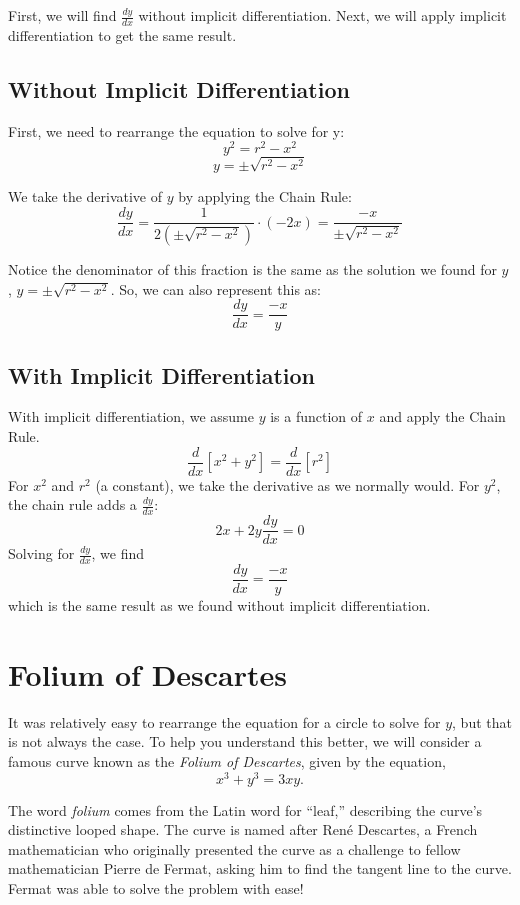 First, we will find $\frac{dy}{dx}$ without implicit 
differentiation. Next, we will apply implicit differentiation to get 
the same result. 

\subsection{Without Implicit Differentiation}
First, we need to rearrange the equation to solve for y: $$y^2 = r^2 
- x^2$$
$$y = \pm \sqrt{r^2 - x^2}$$

We take the derivative of $y$ by applying the Chain Rule:
$$\frac{dy}{dx}=\frac{1}{2 \left(\pm \sqrt{r^2 - x^2}\right)} \cdot (- 2x) = 
\frac{-x}{\pm \sqrt{r^2 - x^2}}$$ 

Notice the denominator of this fraction is the same as the solution 
we found for $y$, $y=\pm \sqrt{r^2-x^2}$. So, we can also represent 
this as: $$\frac{dy}{dx}=\frac{-x}{y}$$

\subsection{With Implicit Differentiation}
With implicit differentiation, we assume $y$ is a function of $x$ and 
apply the Chain Rule. $$\frac{d}{dx}[x^2+y^2]=\frac{d}{dx}[r^2]$$ For 
$x^2$ and $r^2$ (a constant), we take the derivative as we normally would. For 
$y^2$, the chain rule adds a $\frac{dy}{dx}$:
$$2x+2y\frac{dy}{dx}=0$$ Solving for $\frac{dy}{dx}$, we find 
$$\frac{dy}{dx}=\frac{-x}{y}$$ which is the same result as we found 
without implicit differentiation. 

\section{Folium of Descartes}

It was relatively easy to rearrange the equation for a circle to solve for $y$, but that is not always the case. To help you understand this better, we will consider a famous curve known as the \emph{Folium of Descartes}, given by the equation,
\[
x^3 + y^3 = 3xy.
\]

The word \emph{folium} comes from the Latin word for “leaf,” describing the curve’s distinctive looped shape. The curve is named after René Descartes, a French mathematician who originally presented the curve as a challenge  to fellow mathematician Pierre de Fermat, asking him to find the tangent line to the curve. Fermat was able to solve the problem with ease!

